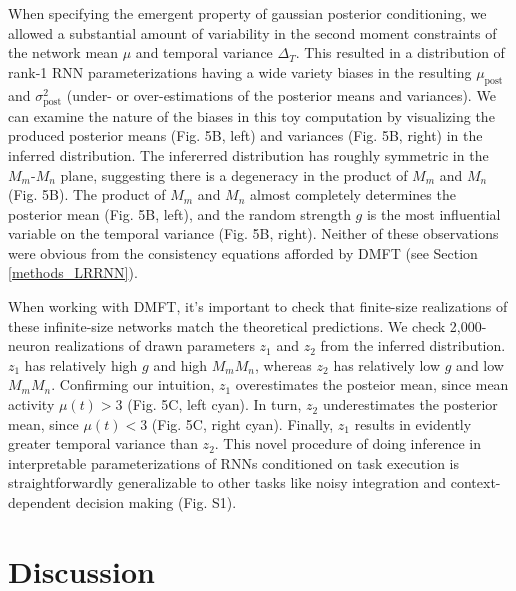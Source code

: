 \documentclass[11pt]{article}
\begin{document}
When specifying the emergent property of gaussian posterior conditioning, we allowed a substantial amount of variability in the second moment constraints of the network mean $\mu$ and temporal variance $\Delta_T$. This resulted in a distribution of rank-1 RNN parameterizations having a wide variety biases in the resulting $\mu_{\text{post}}$ and $\sigma^2_{\text{post}}$ (under- or over-estimations of the posterior means and variances).  We can examine the nature of the biases in this toy computation by visualizing the produced posterior means (Fig. 5B, left) and variances (Fig. 5B, right) in the inferred distribution.  The infererred distribution has roughly symmetric in the $M_m$-$M_n$ plane, suggesting there is a degeneracy in the product of $M_m$ and $M_n$ (Fig. 5B).  
The product of $M_m$ and $M_n$ almost completely determines the posterior mean (Fig. 5B, left), and the random strength $g$ is the most influential variable on the temporal variance (Fig. 5B, right).
Neither of these observations were obvious from the consistency equations afforded by DMFT (see Section \ref{methods_LRRNN}).
 
When working with DMFT, it's important to check that finite-size realizations of these infinite-size networks match the theoretical predictions. We check 2,000-neuron realizations of drawn parameters $z_1$ and $z_2$ from the inferred distribution.  $z_1$ has relatively high $g$ and high $M_m M_n$, whereas $z_2$ has relatively low $g$ and low $M_m M_n$.  Confirming our intuition, $z_1$ overestimates the posteior mean, since mean activity $\mu(t) > 3$  (Fig. 5C, left cyan).  In turn, $z_2$ underestimates the posterior mean, since $\mu(t) < 3$ (Fig. 5C, right cyan).  Finally, $z_1$ results in evidently greater temporal variance than $z_2$. This novel procedure of doing inference in interpretable parameterizations of RNNs conditioned on task execution is straightforwardly generalizable to other tasks like noisy integration and context-dependent decision making (Fig. S1).

\section{Discussion}
\end{document}
